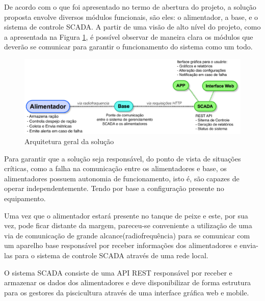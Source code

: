 De acordo com o que foi apresentado no termo de abertura do projeto, a solução proposta envolve diversos módulos funcionais, são eles: o alimentador, a base, e o sistema de controle SCADA. A partir de uma visão de alto nível do projeto, como a apresentada na Figura \ref{diagrama}, é possível observar de maneira clara os módulos que deverão se comunicar para garantir o funcionamento do sistema como um todo.

\begin{figure}[H]
 \centering
   \includegraphics[keepaspectratio=true,scale=0.8]{figuras/digrama_geral.eps}
 \caption{Arquitetura geral da solução}
 \label{diagrama}
\end{figure}

Para garantir que a solução seja responsável, do ponto de vista de situações críticas, como a falha na comunicação entre os alimentadores e base, os alimentadores possuem autonomia de funcionamento, isto é, são capazes de operar independentemente. Tendo por base a configuração presente no equipamento.

Uma vez que o alimentador estará presente no tanque de peixe e este, por sua vez, pode ficar distante da margem, pareceu-se conveniente a utilização de uma via de comunicação de grande alcance(radiofrequência) para se comunicar com um aparelho base responsável por receber informações dos alimentadores e envia-las para o sistema de controle SCADA através de uma rede local.

O sistema SCADA consiste de uma API REST responsável por receber e armazenar os dados dos alimentadores e deve disponibilizar de forma estrutura para os gestores da piscicultura através de uma interface gráfica web e mobile.
